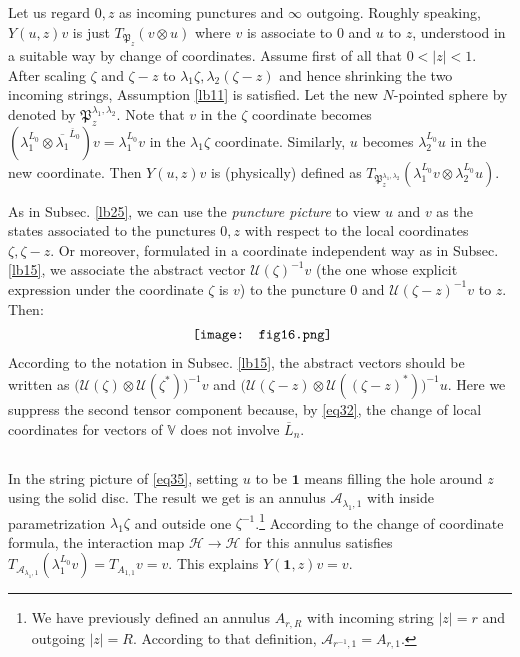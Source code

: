 \documentclass[12pt,a4paper,notitlepage]{article}
\theoremstyle{definition}
\theoremstyle{plain}
\newcommand{\fk}{\mathfrak}
\newcommand{\mc}{\mathcal}
\newcommand{\ovl}{\overline}
\newcommand{\id}{\mathbf{1}}
\newcommand{\Vbb}{\mathbb V}
\numberwithin{equation}{section}
\begin{document}
Let us regard $0,z$ as incoming punctures and $\infty$ outgoing. Roughly speaking, $Y(u,z)v$ is just $T_{\fk P_z}(v\otimes u)$ where $v$ is associate to $0$ and $u$ to $z$, understood in a suitable way by change of coordinates. Assume first of all that $0<|z|<1$. After scaling $\zeta$ and $\zeta-z$ to $\lambda_1\zeta,\lambda_2(\zeta-z)$ and hence shrinking the two incoming strings, Assumption \ref{lb11} is satisfied. Let the new $N$-pointed sphere by denoted by $\fk P_z^{\lambda_1,\lambda_2}$. Note that $v$ in the $\zeta$ coordinate becomes $(\lambda_1^{L_0}\otimes\ovl{\lambda_1}^{\ovl L_0})v=\lambda_1^{L_0}v$ in the $\lambda_1\zeta$ coordinate. Similarly, $u$ becomes $\lambda_2^{L_0}u$ in the new coordinate. Then $Y(u,z)v$ is (physically) defined as $T_{\fk P_z^{\lambda_1,\lambda_2}}(\lambda_1^{L_0} v\otimes \lambda_2^{L_0}u)$. 

As in Subsec. \ref{lb25}, we can use the \emph{puncture picture} to view $u$ and $v$ as the states associated to the punctures $0,z$ with respect to the local coordinates $\zeta,\zeta-z$. Or moreover, formulated in a coordinate independent way as in Subsec. \ref{lb15}, we associate the abstract vector $\mc U(\zeta)^{-1}v$ (the one whose explicit expression under the coordinate $\zeta$ is $v$) to the puncture $0$ and $\mc U(\zeta-z)^{-1}v$ to $z$. Then:
\begin{align}
	\vcenter{\hbox{{
				\texttt{[image: fig16.png]}}}}	\label{eq35}
\end{align}
According to the notation in Subsec. \ref{lb15}, the abstract vectors should be written as $\big(\mc U(\zeta)\otimes \mc U(\zeta^*)\big)^{-1}v$ and $\big(\mc U(\zeta-z)\otimes \mc U((\zeta-z)^*)\big)^{-1}u$. Here we suppress the second tensor component because, by \eqref{eq32}, the change of local coordinates for vectors of $\Vbb$ does not involve $\ovl L_n$.


\subsection{}

In the string picture of \eqref{eq35}, setting $u$ to be $\id$ means filling the hole around $z$ using the solid disc. The result we get is an annulus $\mc A_{\lambda_1,1}$ with inside parametrization $\lambda_1\zeta$ and outside one $\zeta^{-1}$.\footnote{We have previously defined an annulus $A_{r,R}$ with incoming string $|z|=r$ and outgoing $|z|=R$. According to that definition, $\mc A_{r^{-1},1}=A_{r,1}$.} According to the change of coordinate formula, the interaction map $\mc H\rightarrow\mc H$ for this annulus satisfies $T_{\mc A_{\lambda_1,1}}(\lambda_1^{L_0}v)=T_{A_{1,1}}v=v$. This explains $Y(\id,z)v=v$.
\end{document}
